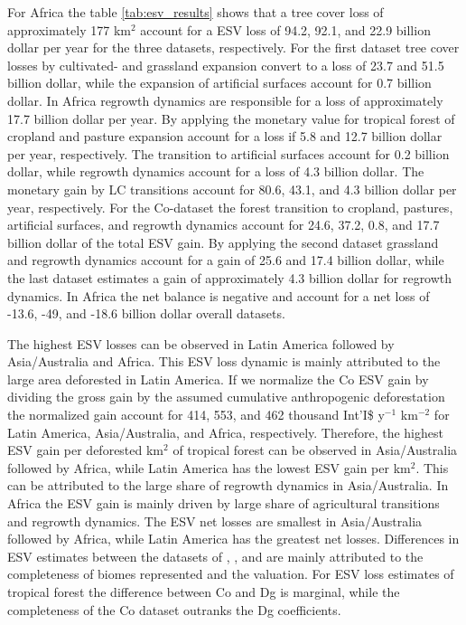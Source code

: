 		For Africa the table \ref{tab:esv_results} shows that a tree cover loss of approximately 177 km$^2$ account for a \ac{ESV} loss of 94.2, 92.1, and 22.9 billion dollar per year for the three datasets, respectively. For the first dataset tree cover losses by cultivated- and grassland expansion convert to a loss of 23.7 and 51.5 billion dollar, while the expansion of artificial surfaces account for 0.7 billion dollar. In Africa regrowth dynamics are responsible for a loss of approximately 17.7 billion dollar per year. By applying the monetary value for tropical forest of \citet{Siikamaki2015} cropland and pasture expansion account for a loss if 5.8 and 12.7 billion dollar per year, respectively. The transition to artificial surfaces account for 0.2 billion dollar, while regrowth dynamics account for a loss of 4.3 billion dollar. The monetary gain by \ac{LC} transitions account for 80.6, 43.1, and 4.3 billion dollar per year, respectively. For the Co-dataset the forest transition to cropland, pastures, artificial surfaces, and regrowth dynamics account for 24.6, 37.2, 0.8, and 17.7 billion dollar of the total \ac{ESV} gain. By applying the second dataset grassland and regrowth dynamics account for a gain of 25.6 and 17.4 billion dollar, while the last dataset estimates a gain of approximately 4.3 billion dollar for regrowth dynamics. In Africa the net balance is negative and account for a net loss of -13.6, -49, and -18.6 billion dollar overall datasets.

		The highest \ac{ESV} losses can be observed in Latin America followed by Asia/Australia and Africa. This \ac{ESV} loss dynamic is mainly attributed to the large area deforested in Latin America. If we normalize the Co \ac{ESV} gain by dividing the gross gain by the assumed cumulative anthropogenic deforestation the normalized gain account for 414, 553, and 462 thousand Int'I\$ y$^{-1}$ km$^{-2}$ for Latin America, Asia/Australia, and Africa, respectively. Therefore, the highest \ac{ESV} gain per deforested km$^2$ of tropical forest can be observed in Asia/Australia followed by Africa, while Latin America has the lowest \ac{ESV} gain per km$^2$. This can be attributed to the large share of regrowth dynamics in Asia/Australia. In Africa the \ac{ESV} gain is mainly driven by large share of agricultural transitions and regrowth dynamics. The \ac{ESV} net losses are smallest in Asia/Australia followed by Africa, while Latin America has the greatest net losses. Differences in \ac{ESV} estimates between the datasets of \citet{Costanza2014}, \citet{Groot2012}, and \citet{Siikamaki2015} are mainly attributed to the completeness of biomes represented and the valuation. For \ac{ESV} loss estimates of tropical forest the difference between Co and Dg is marginal, while the completeness of the Co dataset outranks the Dg coefficients.


